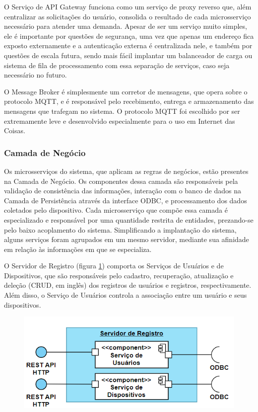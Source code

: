 O Serviço de API Gateway funciona como um serviço de proxy reverso que, além centralizar as solicitações do usuário, consolida o resultado de cada microsserviço necessário para atender uma demanda. Apesar de ser um serviço muito simples, ele é importante por questões de segurança, uma vez que apenas um endereço fica exposto externamente e a autenticação externa é centralizada nele, e também por questões de escala futura, sendo mais fácil implantar um balanceador de carga ou sistema de fila de processamento com essa separação de serviços, caso seja necessário no futuro.

O Message Broker é simplesmente um corretor de mensagens, que opera sobre o protocolo MQTT, e é responsável pelo recebimento, entrega e armazenamento das mensagens que trafegam no sistema. O protocolo MQTT foi escolhido por ser extremamente leve e desenvolvido especialmente para o uso em Internet das Coisas.
    
\subsubsection{Camada de Negócio}

Os microsserviços do sistema, que aplicam as regras de negócios, estão presentes na Camada de Negócio. Os componentes dessa camada são responsáveis pela validação de consistência das informações, interação com o banco de dados na Camada de Persistência através da interface ODBC, e processamento dos dados coletados pelo dispositivo. Cada microsserviço que compõe essa camada é especializado e responsável por uma quantidade restrita de entidades, prezando-se pelo baixo acoplamento do sistema. Simplificando a implantação do sistema, alguns serviços foram agrupados em um mesmo servidor, mediante sua afinidade em relação às informações em que se especializa.

O Servidor de Registro (figura \ref{fig:camada_negocios_registro}) comporta os Serviços de Usuários e de Dispositivos, que são responsáveis pelo cadastro, recuperação, atualização e deleção  (CRUD, em inglês) dos registros de usuários e registros, respectivamente. Além disso, o Serviço de Usuários controla a associação entre um usuário e seus dispositivos.

\begin{figure}[H]
    \centering
    \includegraphics[scale=0.50]{figuras/projeto/software/camada_negocios_registro.PNG}
    \label{fig:camada_negocios_registro}
\end{figure}

